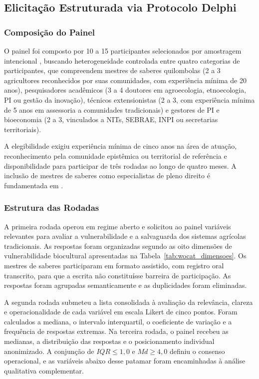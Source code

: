 \documentclass[preprint,authoryear,12pt]{elsarticle}
\begin{document}

\subsection{Elicitação Estruturada via Protocolo Delphi}

\subsubsection{Composição do Painel}

O painel foi composto por 10 a 15 participantes selecionados por amostragem intencional \citep{Patton2015}, buscando heterogeneidade controlada entre quatro categorias de participantes, que compreendem mestres de saberes quilombolas (2 a 3 agricultores reconhecidos por suas comunidades, com experiência mínima de 20 anos), pesquisadores acadêmicos (3 a 4 doutores em agroecologia, etnoecologia, PI ou gestão da inovação), técnicos extensionistas (2 a 3, com experiência mínima de 5 anos em assessoria a comunidades tradicionais) e gestores de PI e bioeconomia (2 a 3, vinculados a NITs, SEBRAE, INPI ou secretarias territoriais).

A elegibilidade exigiu experiência mínima de cinco anos na área de atuação, reconhecimento pela comunidade epistêmica ou territorial de referência e disponibilidade para participar de três rodadas ao longo de quatro meses. A inclusão de mestres de saberes como especialistas de pleno direito é fundamentada em \citet{Santos2007,Beaton2000}.

\subsubsection{Estrutura das Rodadas}

A primeira rodada operou em regime aberto e solicitou ao painel variáveis relevantes para avaliar a vulnerabilidade e a salvaguarda dos sistemas agrícolas tradicionais. As respostas foram organizadas segundo as oito dimensões de vulnerabilidade biocultural apresentadas na Tabela~\ref{tab:wocat_dimensoes}. Os mestres de saberes participaram em formato assistido, com registro oral transcrito, para que a escrita não constituísse barreira de participação. As respostas foram agrupadas semanticamente e as duplicidades foram eliminadas.

A segunda rodada submeteu a lista consolidada à avaliação da relevância, clareza e operacionalidade de cada variável em escala Likert de cinco pontos. Foram calculados a mediana, o intervalo interquartil, o coeficiente de variação e a frequência de respostas extremas. Na terceira rodada, o painel recebeu as medianas, a distribuição das respostas e o posicionamento individual anonimizado. A conjunção de $IQR \leq 1{,}0$ e $Md \geq 4{,}0$ definiu o consenso operacional, e as variáveis abaixo desse patamar foram encaminhadas à análise qualitativa complementar.
\end{document}
